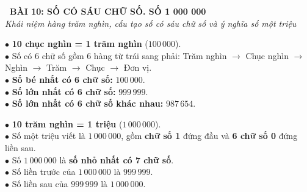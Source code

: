 \documentclass[14pt,a4paper,oneside]{extbook}
\begin{document}
\noindent
\begin{tcolorbox}[
  enhanced,
  colback=teal!8!white,
  colframe=teal!80!black,
  arc=3mm, boxrule=1pt,
  left=3mm, right=3mm, top=2mm, bottom=2mm,
  halign=center
]
  {\Large\bfseries\color{teal!90!black}\faBookmark\ BÀI 10: SỐ CÓ SÁU CHỮ SỐ. SỐ 1 000 000}\\[1.5pt]
  {\footnotesize\itshape\color{black!75} Khái niệm hàng trăm nghìn, cấu tạo số có sáu chữ số và ý nghĩa số một triệu}
\end{tcolorbox}

\vspace{2.5mm}

\noindent
\begin{minipage}[t]{0.49\textwidth}
  \begin{tcolorbox}[
    enhanced,
    title={\footnotesize\bfseries\color{white}\faThLarge\ 1. Hàng trăm nghìn \& Số 6 chữ số},
    colback=blue!2!white,
    colframe=blue!75!black,
    arc=2.5mm, boxrule=0.8pt, top=1.8mm, bottom=1.8mm, left=2mm, right=2mm
  ]
    \footnotesize
    $\bullet$ \textbf{10 chục nghìn = 1 trăm nghìn} ($100\,000$).\\
    $\bullet$ Số có 6 chữ số gồm 6 hàng từ trái sang phải: Trăm nghìn $\rightarrow$ Chục nghìn $\rightarrow$ Nghìn $\rightarrow$ Trăm $\rightarrow$ Chục $\rightarrow$ Đơn vị.\\
    $\bullet$ \textbf{Số bé nhất có 6 chữ số:} $100\,000$.\\
    $\bullet$ \textbf{Số lớn nhất có 6 chữ số:} $999\,999$.\\
    $\bullet$ \textbf{Số lớn nhất có 6 chữ số khác nhau:} $987\,654$.
  \end{tcolorbox}
\end{minipage}%
\hfill
\begin{minipage}[t]{0.49\textwidth}
  \begin{tcolorbox}[
    enhanced,
    title={\footnotesize\bfseries\color{white}\faStar\ 2. Số 1 000 000 (Một triệu)},
    colback=teal!2!white,
    colframe=teal!75!black,
    arc=2.5mm, boxrule=0.8pt, top=1.8mm, bottom=1.8mm, left=2mm, right=2mm
  ]
    \footnotesize
    $\bullet$ \textbf{10 trăm nghìn = 1 triệu} ($1\,000\,000$).\\
    $\bullet$ Số một triệu viết là $1\,000\,000$, gồm \textbf{chữ số 1} đứng đầu và \textbf{6 chữ số 0} đứng liền sau.\\
    $\bullet$ Số $1\,000\,000$ là \textbf{số nhỏ nhất có 7 chữ số}.\\
    $\bullet$ Số liền trước của $1\,000\,000$ là $999\,999$.\\
    $\bullet$ Số liền sau của $999\,999$ là $1\,000\,000$.
  \end{tcolorbox}
\end{minipage}
\end{document}
